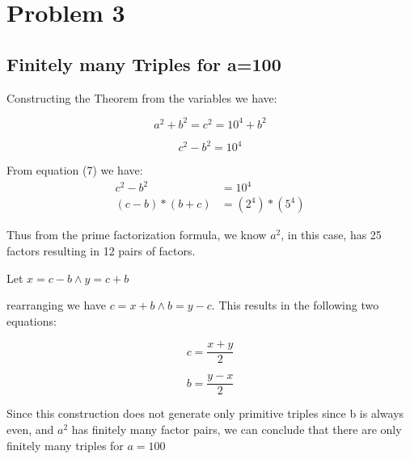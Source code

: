 \documentclass[]{report}
\begin{document}
\section{Problem 3}

\subsection{Finitely many Triples for a=100}
	\begin{itemize}


	\item Constructing the Theorem from the variables we have:
		\begin{center}
	
		\begin{equation}
			a^{2} + b^{2} = c^2 = 10^4 + b^{2} 
		\end{equation}  
	
		\begin{equation}
			c^{2} - b^{2} = 10^{4}
		\end{equation}
	
	\item  From equation (7) we have:				
			\begin{align*}
				c^{2} - b^{2}& = 10^{4}  \\
				(c - b) * (b + c)&= (2^4) * (5^4)
			\end{align*}
				
			\end{center}
	\item Thus from the prime factorization formula, we know $a^2$, in this case, has 25 factors resulting in 12 pairs of factors.
	
	\item Let $ x =  c - b \land y = c + b$ 
	
	\item rearranging we have $ c = x + b \land b = y - c$. This results in the following two equations:
		\begin{center}
	
			\begin{equation}
			c= \frac{x + y}{2}
			\end{equation}  
	
			\begin{equation}
				b=\frac{y - x}{2}
			\end{equation}
	
	
		\end{center}	
		
		
			\item Since this construction does not generate only primitive triples since b is always even, and $a^2$ has finitely many factor pairs, we can conclude that there are only finitely many triples for $a=100$
	\end{itemize}
	
\end{document}
